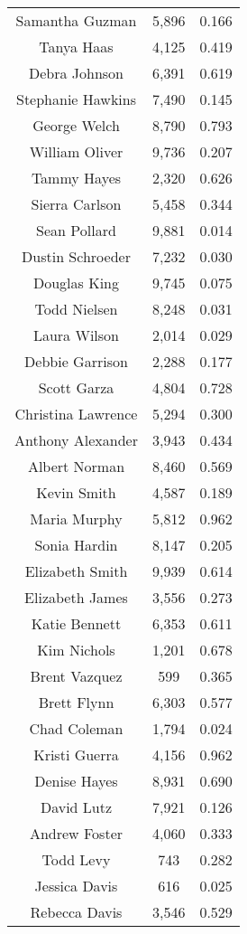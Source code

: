 \begin{longtable}{ccc}
  Samantha Guzman & 5,896 & 0.166 \\
  Tanya Haas & 4,125 & 0.419 \\
  Debra Johnson & 6,391 & 0.619 \\
  Stephanie Hawkins & 7,490 & 0.145 \\
  George Welch & 8,790 & 0.793 \\
  William Oliver & 9,736 & 0.207 \\
  Tammy Hayes & 2,320 & 0.626 \\
  Sierra Carlson & 5,458 & 0.344 \\
  Sean Pollard & 9,881 & 0.014 \\
  Dustin Schroeder & 7,232 & 0.030 \\
  Douglas King & 9,745 & 0.075 \\
  Todd Nielsen & 8,248 & 0.031 \\
  Laura Wilson & 2,014 & 0.029 \\
  Debbie Garrison & 2,288 & 0.177 \\
  Scott Garza & 4,804 & 0.728 \\
  Christina Lawrence & 5,294 & 0.300 \\
  Anthony Alexander & 3,943 & 0.434 \\
  Albert Norman & 8,460 & 0.569 \\
  Kevin Smith & 4,587 & 0.189 \\
  Maria Murphy & 5,812 & 0.962 \\
  Sonia Hardin & 8,147 & 0.205 \\
  Elizabeth Smith & 9,939 & 0.614 \\
  Elizabeth James & 3,556 & 0.273 \\
  Katie Bennett & 6,353 & 0.611 \\
  Kim Nichols & 1,201 & 0.678 \\
  Brent Vazquez & 599 & 0.365 \\
  Brett Flynn & 6,303 & 0.577 \\
  Chad Coleman & 1,794 & 0.024 \\
  Kristi Guerra & 4,156 & 0.962 \\
  Denise Hayes & 8,931 & 0.690 \\
  David Lutz & 7,921 & 0.126 \\
  Andrew Foster & 4,060 & 0.333 \\
  Todd Levy & 743 & 0.282 \\
  Jessica Davis & 616 & 0.025 \\
  Rebecca Davis & 3,546 & 0.529 \\

\end{longtable}
